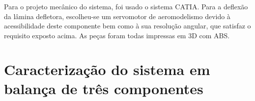 Para o projeto mecânico do sistema, foi usado o sistema CATIA\@. Para a deflexão da lâmina defletora, escolheu-se um servomotor de aeromodelismo devido à acessibilidade deste componente bem como à sua resolução angular, que satisfaz o requisito exposto acima. As peças foram todas impressas em 3D com ABS\@.

\section{Caracterização do sistema em balança de três componentes}\label{sec:method_3axis_measurement}